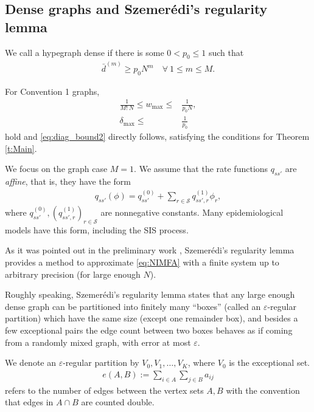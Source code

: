 \documentclass{article}
\newcommand{\1}[1]{{\mathds{1}}_{\left\{#1\right\}}}
\renewcommand{\S}{\mathcal{S}}
\newcommand{\rem}[1]{{#1}}
\begin{document}
	
	\subsection{Dense graphs and Szemer\'edi's regularity lemma}
	
	We call a hypegraph dense if there is some $0<p_0 \leq 1$ such that
	\begin{align}
		\label{def:dense}
		\bar{d}^{(m)} \geq p_0N^m\quad \forall \ 1 \leq m \leq M.
	\end{align}
	
	For Convention 1 graphs,
	\begin{align*}
		\frac{1}{M! \ N}\leq w_{\max} \leq& \frac{1}{p_0 N},\\
		\delta_{\max} \leq & \frac{1}{p_0}
	\end{align*}
	hold and \eqref{eq:diag_bound2} directly follows, satisfying the conditions for Theorem \ref{t:Main}.
	
	We focus on the graph case $M=1$. We assume that the rate functions $q_{ss'}$ are \emph{affine}, that is, they have the form
	\begin{align}
		\label{eq:linear}
		q_{ss'}\left(\phi\right)=q_{ss'}^{(0)}+\sum_{r \in \S}q_{ss',r}^{(1)}\phi_{r}\rem{,}
	\end{align}
	where $q_{ss'}^{(0)}, \left(q_{ss',r}^{(1)} \right)_{r \in \S}$ are nonnegative constants. Many epidemiological models have this form, including the SIS process.
	
	As it was pointed out in the preliminary work \cite{unified_meanfield}, Szemer\'edi's regularity lemma \cite{Szemeredi} provides a method to approximate \eqref{eq:NIMFA} with a finite system up to arbitrary precision (for large enough $N$).
	
	Roughly speaking, Szemer\'edi's regularity lemma states that any large enough dense graph can be partitioned into finitely many ``boxes'' (called an $\varepsilon$-regular partition) which have the same size (except one remainder box), and besides a few exceptional pairs the edge count between two boxes behaves as if coming from a randomly mixed graph, with error at most $\varepsilon$.
	
	We denote  an $\varepsilon$-regular partition by $V_0,V_1, \dots, V_K$, where $V_0$ is the exceptional set. 
	\begin{align*}
		e(A,B):=\sum_{i \in A} \sum_{j \in B} a_{ij}
	\end{align*}
	refers to the number of edges between the vertex sets $A,B$ with the convention that edges in $A \cap B$ are counted double. 
	
\end{document}
